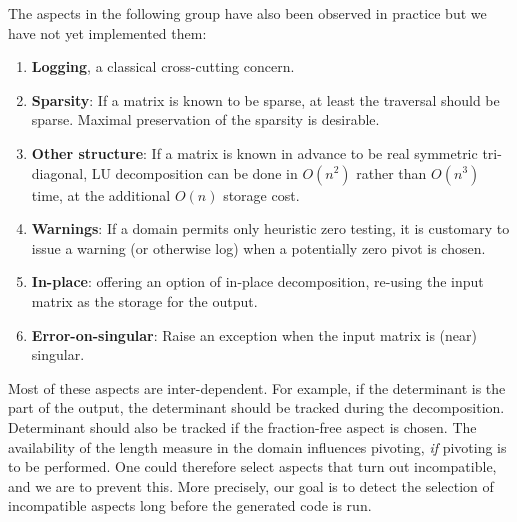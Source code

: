 \documentclass[draft]{elsart}
\newcommand{\omitnow}[1]{}
\begin{document}
The aspects in the following group have also been observed in
practice but we have not yet implemented them:
\begin{enumerate}
\setcounter{enumi}{\value{naspects}}
\item \textbf{Logging}, a classical cross-cutting concern.
\item \textbf{Sparsity}: If a matrix is known to be sparse, at least
the traversal should be sparse. Maximal preservation of the sparsity
is desirable. 
\item \textbf{Other structure}: If a matrix is known in
advance to be real symmetric tri-diagonal, LU decomposition can be
done in $O(n^2)$ rather than $O(n^3)$ time, at the additional $O(n)$
storage cost.
\item \textbf{Warnings}: If a domain permits only heuristic zero
testing, it is customary to issue a warning (or otherwise log) when 
a potentially zero pivot is chosen.
\item \textbf{In-place}: offering an option of in-place decomposition,
  re-using the input matrix as the storage for the output.
\item \textbf{Error-on-singular}: Raise an exception when the input
  matrix is (near) singular.
\setcounter{naspects}{\value{enumi}}
\end {enumerate}

Most of these aspects are inter-dependent. For example, if the
determinant is the part of the output, the determinant should be
tracked during the decomposition. Determinant should also be tracked
if the fraction-free aspect is chosen. The availability of the length
measure in the domain influences pivoting, \emph{if} pivoting
is to be performed. One could therefore select aspects that turn out
incompatible, and we are to prevent this. 
More precisely, our goal is to detect the selection of
incompatible aspects long before the generated code is run.


\omitnow{Clearly the above $\thenaspects$ aspects have a rather complex 
dependency graph.  While some aspects are purely orthogonal to others, 
most are inter-dependent.  For example, if one wants the determinant of
the matrix as part of the output, then the determinant has to be tracked
during the algorithm; a priori, it is possible to make incompatible choices,
and our implementation has to insure that this is in fact impossible.
There are other kinds of dependencies: for example, 
  While there are no circular dependencies, there is
no clear directed graph of dependencies.  In other words, one cannot 
simply use product, co-products, and compositions of the various aspects 
to build the resulting algorithm.  We will get back to this point when
we describe the details of the implementation.}
\end{document}

